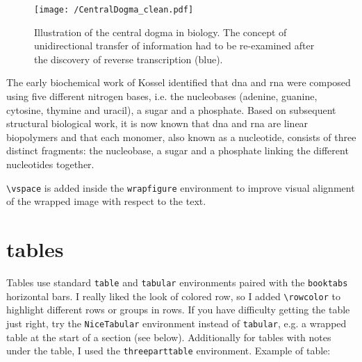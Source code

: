 \begin{wrapfigure}[10]{i}{.5\textwidth}\centering
\vspace{-\intextsep}
\texttt{[image: /CentralDogma\_clean.pdf]}
\caption{Illustration of the central dogma in biology. The concept of unidirectional transfer of information had to be re-examined after the discovery of reverse transcription (blue).}\label{intro:fig:centraldogma}	
\end{wrapfigure}
The early biochemical work of Kossel identified that \gls{dna} and \gls{rna} were composed using five different nitrogen bases, i.e. the nucleobases (\gls{adenine}, \gls{guanine}, \gls{cytosine}, \gls{thymine} and \gls{uracil}), a sugar and a phosphate.\autocite{Dahm2008} Based on subsequent structural biological work, it is now known that \gls{dna} and \gls{rna} are linear biopolymers and that each monomer, also known as a nucleotide, consists of three distinct fragments: the nucleobase, a sugar and a phosphate linking the different nucleotides together.

\verb=\vspace= is added inside the \verb=wrapfigure= environment to improve visual alignment of the wrapped image with respect to the text.

\section{tables}

Tables use standard \verb=table= and \verb=tabular= environments paired with the \verb=booktabs= horizontal bars. I really liked the look of colored row, so I added \verb=\rowcolor= to highlight different rows or groups in rows. If you have difficulty getting the table just right, try the \verb=NiceTabular= environment instead of \verb=tabular=, e.g. a wrapped table at the start of a section (see below). Additionally for tables with notes under the table, I used the \verb=threeparttable= environment.
Example of table:

